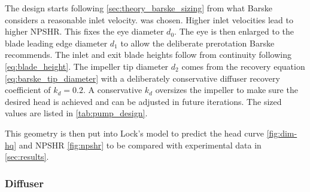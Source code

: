  The design starts following \cref{sec:theory_barske_sizing} from what Barske considers a reasonable inlet velocity. \valPumpUZeroDesign was chosen. Higher inlet velocities lead to higher NPSHR. This fixes the eye diameter $d_0$. The eye is then enlarged to the blade leading edge diameter $d_1$ to allow the deliberate prerotation Barske recommends. The inlet and exit blade heights follow from continuity following \cref{eq:blade_height}. The impeller tip diameter $d_2$ comes from the recovery equation \cref{eq:barske_tip_diameter} with a deliberately conservative diffuser recovery coefficient of $k_d = 0.2$. A conservative $k_d$ oversizes the impeller to make sure the desired head is achieved and can be adjusted in future iterations. The sized values are listed in \cref{tab:pump_design}.%

This geometry is then put into Lock's model to predict the head curve \cref{fig:dim-hq} and NPSHR \cref{fig:npshr} to be compared with experimental data in \cref{sec:results}.


\begin{table}[H]
  \centering
  \caption{Pump design summary. The impeller dimensions are the sizing code output; the diffuser throat $d_3$ and exit $d_4$ are the as-built values, which depart from the sized values for the reasons given in the text.}
  \label{tab:pump_design}
  
\end{table}

\subsubsection{Diffuser}


